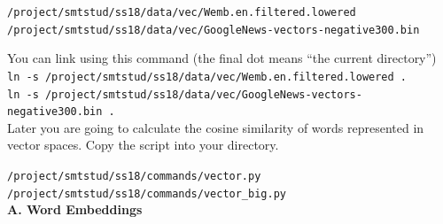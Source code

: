 \documentclass[12pt,fleqn]{article}
\begin{document}
\vspace{0.5cm}
\texttt{/project/smtstud/ss18/data/vec/Wemb.en.filtered.lowered} 
\texttt{/project/smtstud/ss18/data/vec/GoogleNews-vectors-negative300.bin} 

You can link using this command (the final dot means ``the current directory'')\\
\texttt{ln -s /project/smtstud/ss18/data/vec/Wemb.en.filtered.lowered .} \\ 
\texttt{ln -s /project/smtstud/ss18/data/vec/GoogleNews-vectors-negative300.bin .} \\


\vspace{0.5cm} 
Later you are going to calculate the cosine similarity of words represented in vector spaces. Copy the script into your directory. 

\vspace{0.5cm} 
\texttt{/project/smtstud/ss18/commands/vector.py} \\
\texttt{/project/smtstud/ss18/commands/vector\_big.py} \\

\vspace{0.5cm} 
\textbf{A. Word Embeddings} \\ 
\end{document}
